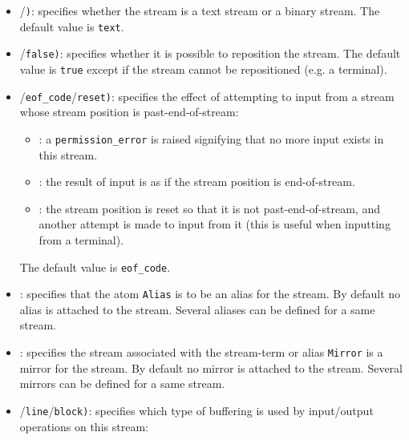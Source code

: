 \begin{itemize}

\item {}/\texttt{)}: specifies whether the
stream is a text stream or a binary stream. The default value is
\texttt{text}.

\item {}/\texttt{false)}: specifies
whether it is possible to reposition the stream. The default value is
\texttt{true} except if the stream cannot be repositioned (e.g. a terminal).

\item {}/\texttt{eof\_code}/\texttt{reset)}:
specifies the effect of attempting to input from a stream whose stream
position is past-end-of-stream:

\begin{itemize}

\item {}: a \texttt{permission\_error} is raised signifying that
no more input exists in this stream.

\item {}: the result of input is as if the stream position
is end-of-stream.

\item {}: the stream position is reset so that it is not
past-end-of-stream, and another attempt is made to input from it (this is
useful when inputting from a terminal).

\end{itemize}

The default value is \texttt{eof\_code}.

\item {}: specifies that the atom \texttt{Alias}
is to be an alias for the stream. By default no alias is attached to the
stream. Several aliases can be defined for a same stream.

\item {}: specifies the stream associated with
the stream-term or alias \texttt{Mirror} is a mirror for the stream. By
default no mirror is attached to the stream. Several mirrors can be defined
for a same stream.

\item {}/\texttt{line}/\texttt{block)}:
specifies which type of buffering is used by input/output operations on
this stream:


\end{itemize}
